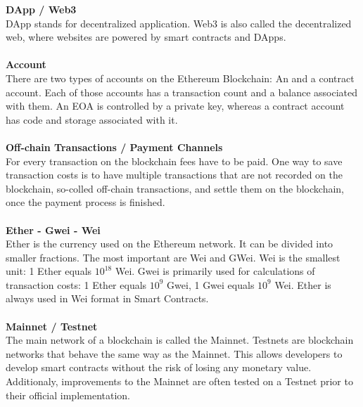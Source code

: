 \textbf{DApp / Web3}\\
DApp stands for decentralized application. Web3 is also called the decentralized web, where websites are powered by smart contracts and DApps. 
\\\\

\textbf{Account}\\
There are two types of accounts on the Ethereum Blockchain: An  and a contract account. Each of those accounts has a transaction count and a balance\cite{ethereum-yellow-paper} associated with them. An EOA is controlled by a private key, whereas a contract account has code and storage associated with it.
\\\\

\textbf{Off-chain Transactions / Payment Channels}\\
For every transaction on the blockchain fees have to be paid. One way to save transaction costs is to have multiple transactions that are not recorded on the blockchain, so-colled off-chain transactions, and settle them on the blockchain, once the payment process is finished.
\\\\

\textbf{Ether - Gwei - Wei}\\
Ether is the currency used on the Ethereum network. It can be divided into smaller fractions. The most important are Wei and GWei. Wei is the smallest unit: 1 Ether equals \(10^{18}\) Wei\cite{ethereum-yellow-paper}. Gwei is primarily used for calculations of transaction costs: 1 Ether equals \(10^{9}\) Gwei, 1 Gwei equals \(10^{9}\) Wei. Ether is always used in Wei format in Smart Contracts.
\\\\

\textbf{Mainnet / Testnet}\\
The main network of a blockchain is called the Mainnet. Testnets are blockchain networks that behave the same way as the Mainnet. This allows developers to develop smart contracts without the risk of losing any monetary value. Additionaly, improvements to the Mainnet are often tested on a Testnet prior to their official implementation.